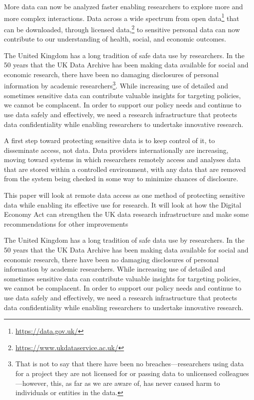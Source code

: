\documentclass{CUP-JNL-DAP}%
\begin{document}
More data can now be analyzed faster enabling researchers to explore more and more complex
interactions. Data across a wide spectrum from open data\footnote{\url{https://data.gov.uk/}} that can be downloaded, through licensed data,\footnote{\url{https://www.ukdataservice.ac.uk/}}
to sensitive personal data can now contribute to our understanding of health, social, and economic outcomes.

The United Kingdom has a long tradition of safe data use by researchers. In the 50 years that the UK
Data Archive has been making data available for social and economic research, there have been no
damaging disclosures of personal information by academic researchers\footnote{That is not to say that there have been no breaches---researchers using data for a project they are not licensed for or passing data
to unlicensed colleagues---however, this, as far as we are aware of, has never caused harm to individuals or entities in the data.}. While increasing use of detailed and sometimes sensitive
data can contribute valuable insights for targeting policies, we cannot be
complacent. In order to support our policy needs and continue to use data safely and effectively, we
need a research infrastructure that protects data confidentiality while enabling researchers to undertake
innovative research.

A first step toward protecting sensitive data is to keep control of it, to disseminate access, not data. Data
providers internationally are increasing, moving toward systems in which researchers remotely access and
analyses data that are stored within a controlled environment, with any data that are removed from the
system being checked in some way to minimize chances of disclosure.

This paper will look at remote data access as one method of protecting sensitive data while enabling its
effective use for research. It will look at how the Digital Economy Act can strengthen the UK data research
infrastructure and make some recommendations for other improvements

The United Kingdom has a long tradition of safe data use by researchers. In the 50 years that the UK
Data Archive has been making data available for social and economic research, there have been no
damaging disclosures of personal information by academic researchers. While increasing use of detailed and sometimes sensitive
data can contribute valuable insights for targeting policies, we cannot be
complacent. In order to support our policy needs and continue to use data safely and effectively, we
need a research infrastructure that protects data confidentiality while enabling researchers to undertake
innovative research.
\end{document}
